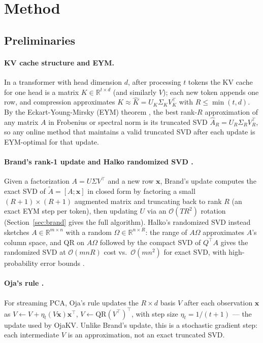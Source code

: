 \documentclass{article}
\newcommand{\R}{\mathbb{R}}
\begin{document}
\section{Method}
\label{sec:method}

\subsection{Preliminaries}
\label{sec:background}

\paragraph{KV cache structure and EYM.}
In a transformer with head dimension $d$, after processing $t$ tokens the KV
cache for one head is a matrix $K \in \R^{t \times d}$ (and similarly $V$);
each new token appends one row, and compression approximates
$K \approx \hat{K} = U_K \Sigma_K V_K^\top$ with $R \leq \min(t, d)$.  By the
Eckart-Young-Mirsky (EYM) theorem \citep{eckart1936,mirsky1960}, the best rank-$R$ approximation of any
matrix $A$ in Frobenius or spectral norm is its truncated SVD
$\hat{A}_R = U_R \Sigma_R V_R^\top$, so any online method that maintains a
valid truncated SVD after each update is EYM-optimal for that update.

\paragraph{Brand's rank-1 update \citep{brand2006} and Halko randomized SVD \citep{halko2011}.}
Given a factorization $A = U \Sigma V^\top$ and a new row $\mathbf{x}$,
Brand's update computes the exact SVD of $\tilde{A} = [A; \mathbf{x}]$ in
closed form by factoring a small $(R+1) \times (R+1)$ augmented matrix and
truncating back to rank $R$ (an exact EYM step per token), then updating
$U$ via an $\mathcal{O}(TR^2)$ rotation (Section~\ref{sec:brand} gives the
full algorithm).  Halko's randomized SVD instead sketches $A \in
\R^{m \times n}$ with a random $\Omega \in \R^{n \times R}$: the range of
$A\Omega$ approximates $A$'s column space, and QR on $A\Omega$ followed by
the compact SVD of $Q^\top A$ gives the randomized SVD at
$\mathcal{O}(mnR)$ cost vs.\ $\mathcal{O}(mn^2)$ for exact SVD, with
high-probability error bounds \citep{halko2011}.

\paragraph{Oja's rule \citep{oja1982}.}
For streaming PCA, Oja's rule updates the $R \times d$ basis $V$ after each
observation $\mathbf{x}$ as $V \leftarrow V + \eta_t (V\mathbf{x})\mathbf{x}^\top$,
$V \leftarrow \mathrm{QR}(V^\top)^\top$, with step size $\eta_t = 1/(t+1)$
--- the update used by OjaKV.  Unlike Brand's update, this is a stochastic
gradient step: each intermediate $V$ is an approximation, not an exact
truncated SVD.
\end{document}
